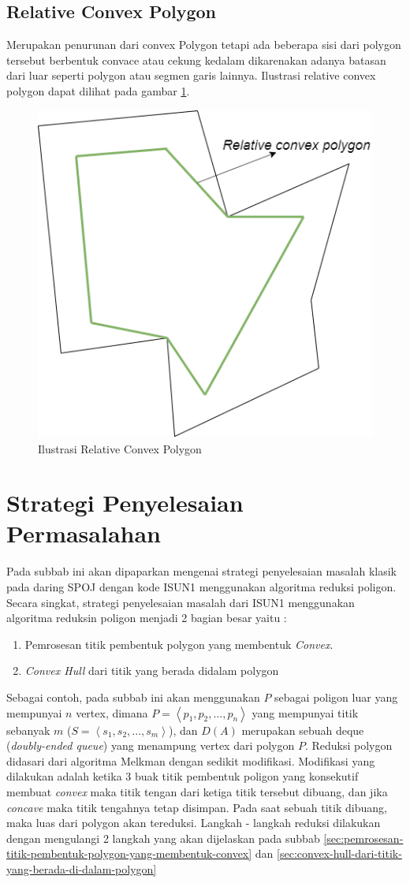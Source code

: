 \subsection{Relative Convex Polygon}
Merupakan penurunan dari convex Polygon tetapi ada beberapa sisi dari polygon tersebut berbentuk convace atau cekung kedalam dikarenakan adanya batasan dari luar seperti polygon atau segmen garis lainnya. Ilustrasi relative convex polygon dapat dilihat pada gambar \ref{fig:ilustrasi-relative-convex-polygon}.
\begin{figure}
    \Centering
    \includegraphics[width=0.5\columnwidth]{bab2/img/ilustrasi-relative-convex-polygon}
    \caption{Ilustrasi Relative Convex Polygon}
    \label{fig:ilustrasi-relative-convex-polygon}
\end{figure}
\section{Strategi Penyelesaian Permasalahan}
Pada subbab ini akan dipaparkan mengenai strategi penyelesaian masalah klasik pada daring SPOJ dengan kode ISUN1 menggunakan algoritma reduksi poligon. Secara singkat, strategi penyelesaian masalah dari ISUN1 menggunakan algoritma reduksin poligon menjadi 2 bagian besar yaitu :
\begin{enumerate}
    \item Pemrosesan titik pembentuk polygon yang membentuk \textit{Convex}.
    \item \textit{Convex Hull} dari titik yang berada didalam polygon
\end{enumerate}
Sebagai contoh, pada subbab ini akan menggunakan $P$ sebagai poligon luar yang mempunyai $n$ vertex, dimana $P = \left \langle p_1, p_2, ..., p_n \right \rangle$ yang mempunyai titik sebanyak $m$ ($S = \left \langle s_1, s_2, ..., s_m \right \rangle$), dan $D(A)$ merupakan sebuah deque (\textit{doubly-ended queue}) yang menampung vertex dari polygon $P$. Reduksi polygon didasari dari algoritma Melkman dengan sedikit modifikasi. Modifikasi yang dilakukan adalah ketika 3 buak titik pembentuk poligon yang konsekutif membuat \textit{convex} maka titik tengan dari ketiga titik tersebut dibuang, dan jika \textit{concave} maka titik tengahnya tetap disimpan. Pada saat sebuah titik dibuang, maka luas dari polygon akan tereduksi. Langkah - langkah reduksi dilakukan dengan mengulangi 2 langkah yang akan dijelaskan pada subbab \ref{sec:pemrosesan-titik-pembentuk-polygon-yang-membentuk-convex} dan \ref{sec:convex-hull-dari-titik-yang-berada-di-dalam-polygon}


